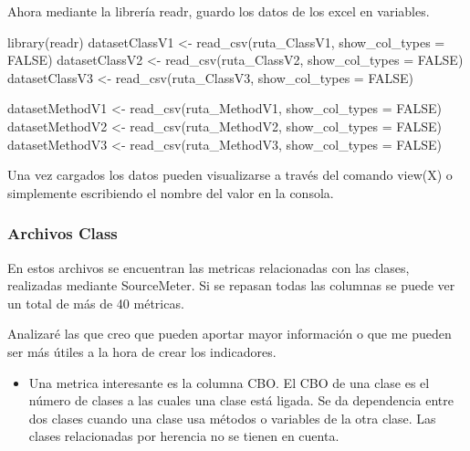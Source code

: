 \documentclass[
]{article}
\newenvironment{Shaded}{\begin{snugshade}}{\end{snugshade}}
\newcommand{\AttributeTok}[1]{\textcolor[rgb]{0.77,0.63,0.00}{#1}}
\newcommand{\ConstantTok}[1]{\textcolor[rgb]{0.00,0.00,0.00}{#1}}
\newcommand{\FunctionTok}[1]{\textcolor[rgb]{0.00,0.00,0.00}{#1}}
\newcommand{\NormalTok}[1]{#1}
\newcommand{\OtherTok}[1]{\textcolor[rgb]{0.56,0.35,0.01}{#1}}
\providecommand{\tightlist}{%
  \setlength{\itemsep}{0pt}\setlength{\parskip}{0pt}}
\begin{document}
Ahora mediante la librería readr, guardo los datos de los excel en
variables.

\begin{Shaded}
\begin{Highlighting}[]
\FunctionTok{library}\NormalTok{(readr)}
\NormalTok{datasetClassV1 }\OtherTok{\textless{}{-}} \FunctionTok{read\_csv}\NormalTok{(ruta\_ClassV1, }\AttributeTok{show\_col\_types =} \ConstantTok{FALSE}\NormalTok{)}
\NormalTok{datasetClassV2 }\OtherTok{\textless{}{-}} \FunctionTok{read\_csv}\NormalTok{(ruta\_ClassV2, }\AttributeTok{show\_col\_types =} \ConstantTok{FALSE}\NormalTok{)}
\NormalTok{datasetClassV3 }\OtherTok{\textless{}{-}} \FunctionTok{read\_csv}\NormalTok{(ruta\_ClassV3, }\AttributeTok{show\_col\_types =} \ConstantTok{FALSE}\NormalTok{)}

\NormalTok{datasetMethodV1 }\OtherTok{\textless{}{-}} \FunctionTok{read\_csv}\NormalTok{(ruta\_MethodV1, }\AttributeTok{show\_col\_types =} \ConstantTok{FALSE}\NormalTok{)}
\NormalTok{datasetMethodV2 }\OtherTok{\textless{}{-}} \FunctionTok{read\_csv}\NormalTok{(ruta\_MethodV2, }\AttributeTok{show\_col\_types =} \ConstantTok{FALSE}\NormalTok{)}
\NormalTok{datasetMethodV3 }\OtherTok{\textless{}{-}} \FunctionTok{read\_csv}\NormalTok{(ruta\_MethodV3, }\AttributeTok{show\_col\_types =} \ConstantTok{FALSE}\NormalTok{)}
\end{Highlighting}
\end{Shaded}

Una vez cargados los datos pueden visualizarse a través del comando
view(X) o simplemente escribiendo el nombre del valor en la consola.

\hypertarget{archivos-class}{%
\subsubsection{Archivos Class}\label{archivos-class}}

En estos archivos se encuentran las metricas relacionadas con las
clases, realizadas mediante SourceMeter. Si se repasan todas las
columnas se puede ver un total de más de 40 métricas.

Analizaré las que creo que pueden aportar mayor información o que me
pueden ser más útiles a la hora de crear los indicadores.

\begin{itemize}
\tightlist
\item
  Una metrica interesante es la columna CBO. El CBO de una clase es el
  número de clases a las cuales una clase está ligada. Se da dependencia
  entre dos clases cuando una clase usa métodos o variables de la otra
  clase. Las clases relacionadas por herencia no se tienen en cuenta.
\end{itemize}
\end{document}
